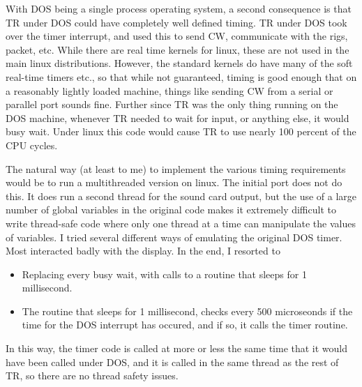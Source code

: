\documentclass[12pt]{article}
\begin{document}
With DOS being a single process operating system, a second consequence is
that TR under DOS could have completely well defined timing. TR under DOS
took over the timer interrupt, and used this to send CW, communicate with
the rigs, packet, etc. While there are real time kernels for linux,
these are not used in the main linux distributions. However, the
standard kernels do have many of the soft real-time timers etc., so that
while not guaranteed, timing is good enough that on a reasonably
lightly loaded machine, things like sending CW from a serial or parallel
port sounds fine. Further since TR was the only thing running on the DOS
machine, whenever TR needed to wait for input, or anything else, it would
busy wait. Under linux this code would cause TR to use nearly 100 percent
of the CPU cycles.

The natural way (at least to me) to implement the various timing requirements
would be to run a multithreaded version on linux. The initial port does
not do this. It does run a second thread for the sound card output, but
the use of a large number of global variables in the original code makes
it extremely difficult to write thread-safe code where only one thread
at a time can manipulate the values of variables. I tried several different
ways of emulating the original DOS timer. Most interacted badly with
the display. In the end, I resorted to
\begin{itemize}
\item
Replacing every busy wait, with calls to a routine that sleeps for
1 millisecond.
\item
The routine that sleeps for 1 millisecond, checks every 500 microseonds
if the time for the DOS interrupt has occured, and if so, it calls
the timer routine.
\end{itemize}
In this way, the timer code is called at more or less the same
time that it would have been called under DOS, and it is called in the
same thread as the rest of TR, so there are no thread safety issues.
\end{document}
